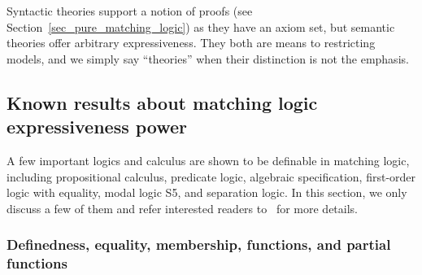 \documentclass{amsart}
\begin{document}
Syntactic theories support a notion of proofs (see Section~\ref{sec_pure_matching_logic})
as they have an axiom set,
but semantic theories offer arbitrary expressiveness.
They both are means to restricting models,
and we simply say ``theories'' when their distinction is not the emphasis.





\subsection{Known results about matching logic expressiveness power}




A few important logics and calculus are shown to be definable 
in matching logic, including
propositional calculus, predicate logic,
algebraic specification, first-order logic with equality,
modal logic S5, and separation logic.
In this section, we only discuss a few of them and refer interested readers
to~\cite{bibid} for more details.

\subsubsection{Definedness, equality, membership, functions, and partial 
functions}
\end{document}
